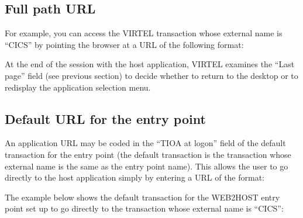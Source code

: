 \documentclass[letterpaper,10pt,english]{sphinxmanual}
\begin{document}
\subsection{Full path URL}
\label{\detokenize{Customization:full-path-url}}
\sphinxAtStartPar
For example, you can access the VIRTEL transaction whose external name is “CICS” by pointing the browser at a URL of the following format:

\begin{sphinxVerbatim}[commandchars=\\\{\}]
\end{sphinxVerbatim}

\sphinxAtStartPar
At the end of the session with the host application, VIRTEL examines the “Last page” field (see previous section) to decide whether to return to the desktop or to redisplay the application selection menu.

\ignorespaces 

\subsection{Default URL for the entry point}
\label{\detokenize{Customization:default-url-for-the-entry-point}}\label{\detokenize{Customization:index-59}}
\sphinxAtStartPar
An application URL may be coded in the “TIOA at logon” field of the default transaction for the entry point (the default transaction is the transaction whose external name is the same as the entry point name). This allows the user to go directly to the host application simply by entering a URL of the format:

\begin{sphinxVerbatim}[commandchars=\\\{\}]
\end{sphinxVerbatim}

\sphinxAtStartPar
The example below shows the default transaction for the WEB2HOST entry point set up to go directly to the transaction whose external name is “CICS”:
\end{document}
